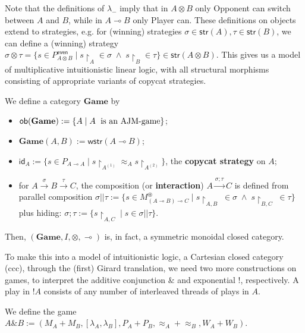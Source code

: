 \documentclass[runningheads,a4paper]{llncs}
\newcommand{\ra}[1]{\stackrel{#1}{\longrightarrow}}
\newcommand{\Gamecat}{\mathbf{Game}}
\newcommand{\str}{\mathsf{str}}
\newcommand{\wstr}{\mathsf{wstr}}
\renewcommand{\emph}[1]{\textbf{#1}}
\begin{document}
Note that the definitions of $\lambda_{-}$ imply that in $A\otimes B$ only Opponent can switch between $A$ and $B$, while in $A\multimap B$ only Player can. These definitions on objects extend to strategies, e.g. for (winning) strategies $\sigma\in\str(A), \tau\in\str(B)$, we can define a (winning) strategy $\sigma\otimes \tau=\{s\in P_{A\otimes B}^\mathsf{even}\;|\; s\upharpoonright_A\in \sigma \;\wedge\; s\upharpoonright_B\in \tau\}\in\str(A\otimes B)$. This gives us a model of multiplicative intuitionistic linear logic, with all structural morphisms consisting of appropriate variants of copycat strategies.
\begin{theorem} We define a category $\Gamecat$ by\vspace{-6pt}
\begin{itemize}
\item $\mathsf{ob}(\Gamecat):=\{A\;|\; A\;\textnormal{ is an AJM-game}\}$;
\item $\Gamecat(A,B):=\wstr(A\multimap B)$;
\item $\mathsf{id}_A:=\{s\in P_{A\multimap A}\;|\; s\upharpoonright_{A^{(1)}}\approx_A s\upharpoonright_{A^{(2)}}\}$, the \emph{copycat strategy} on $A$;
\item for $A\ra{\sigma}B\ra{\tau}C$, the composition (or \emph{interaction}) $A\ra{\sigma;\tau}C$ is defined from parallel composition $\sigma||\tau:=\{s\in M_{(A\multimap B)\multimap C}^\circledast \;|\; s\upharpoonright_{A,B}\;\in\sigma\;\wedge \; s\upharpoonright_{B,C}\;\in\tau\}$ plus hiding: $\sigma;\tau:=\{s\upharpoonright_{A,C}\;|\; s\in \sigma||\tau\}$.
\end{itemize}
Then, $(\Gamecat,I,\otimes,\multimap)$ is, in fact, a symmetric monoidal closed category.
\end{theorem}
To make this into a model of intuitionistic logic, a Cartesian closed category (ccc), through the (first) Girard translation, we need two more constructions on games, to interpret the additive conjunction $\&$ and exponential $!$, respectively. A play in $!A$ consists of any number of interleaved threads of plays in $A$.
\begin{definition}[With] We define the game\\ $A\& B:=(M_A+M_B,[\lambda_A,\lambda_B],P_A+P_B,\approx_A+\approx_B,W_A + W_B)$.
\end{definition}
\end{document}

